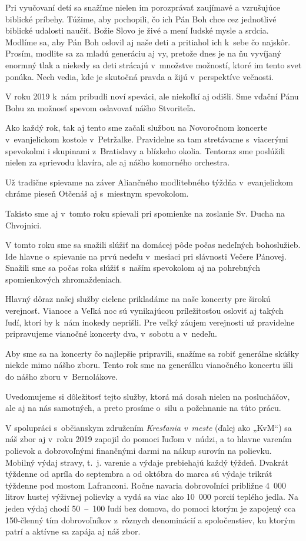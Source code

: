 Pri vyučovaní detí sa snažíme nielen im porozprávať zaujímavé a vzrušujúce biblické príbehy. Túžime, aby pochopili, čo ich Pán Boh chce cez jednotlivé biblické udalosti naučiť. Božie Slovo je živé a mení ľudské mysle a srdcia. Modlíme sa, aby Pán Boh oslovil aj naše deti a pritiahol ich k~sebe čo najskôr. Prosím, modlite sa za mladú generáciu aj vy, pretože dnes je na ňu vyvíjaný enormný tlak a niekedy sa deti strácajú v~množstve možností, ktoré im tento svet ponúka. Nech vedia, kde je skutočná pravda a žijú v~perspektíve večnosti.



V roku 2019 k~nám pribudli noví speváci, ale niekoľkí aj odišli. Sme vďační Pánu Bohu za možnosť spevom oslavovať nášho Stvoriteľa.

Ako každý rok, tak aj tento sme začali službou na Novoročnom koncerte v~evanjelickom kostole v~Petržalke. Pravidelne sa tam stretávame s~viacerými spevokolmi i skupinami z~Bratislavy a blízkeho okolia. Tentoraz sme poslúžili nielen za sprievodu klavíra, ale aj nášho komorného orchestra.

Už tradične spievame na záver Aliančného modlitebného týždňa v~evanjelickom chráme pieseň Otčenáš aj s~miestnym spevokolom.

Takisto sme aj v~tomto roku spievali pri spomienke na zoslanie Sv. Ducha na Chvojnici.

V tomto roku sme sa snažili slúžiť na domácej pôde počas nedeľných bohoslužieb.  Ide hlavne o~spievanie na prvú nedeľu v~mesiaci pri slávnosti Večere Pánovej. Snažili sme sa počas roka slúžiť s~naším spevokolom aj na pohrebných spomienkových zhromaždeniach.

Hlavný dôraz našej služby cielene prikladáme na naše koncerty pre širokú verejnosť. Vianoce a Veľká noc sú vynikajúcou príležitosťou osloviť aj takých ľudí, ktorí by k~nám inokedy neprišli. Pre veľký záujem verejnosti už pravidelne pripravujeme vianočné koncerty dva, v~sobotu a v~nedeľu.

Aby sme sa na koncerty čo najlepšie pripravili, snažíme sa robiť generálne skúšky niekde mimo nášho zboru. Tento rok sme na generálku vianočného koncertu išli do nášho zboru v~Bernolákove.

Uvedomujeme si dôležitosť tejto služby, ktorá má dosah nielen na poslucháčov, ale aj na nás samotných, a preto prosíme o~silu a požehnanie na túto prácu.



V spolupráci s~občianskym združením {\it Kresťania v~meste} (ďalej ako „KvM“) sa náš zbor aj v~roku 2019 zapojil do pomoci ľuďom v~núdzi, a to hlavne varením polievok a dobrovoľnými finančnými darmi na nákup surovín na polievku. Mobilný výdaj stravy, t.~j. varenie a výdaje prebiehajú každý týždeň. Dvakrát týždenne od apríla do septembra a od októbra do marca sú výdaje trikrát týždenne pod mostom Lafranconi. Ročne navaria dobrovoľníci približne 4~000 litrov hustej výživnej polievky a vydá sa viac ako 10~000 porcií teplého jedla. Na jeden výdaj chodí 50~--~100 ľudí bez domova, do pomoci ktorým je zapojený cca 150-členný tím dobrovoľníkov z~rôznych denominácií a spoločenstiev, ku ktorým patrí a aktívne sa zapája aj náš zbor.

